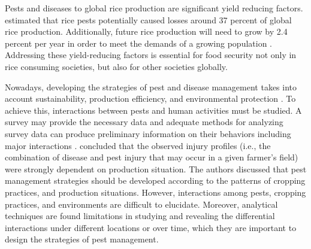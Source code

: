 ﻿%

Pests and diseases to global rice production are significant yield reducing factors.  estimated that rice pests potentially caused losses around 37 percent of global rice production. Additionally, future rice production will need to grow by 2.4 percent per year in order to meet the demands of a growing population . Addressing these yield-reducing factors is essential for food security not only in rice consuming societies, but also for other societies globally.

%
% 
%

Nowadays, developing the strategies of pest and disease management takes into account sustainability, production efficiency, and environmental protection . To achieve this, interactions between pests and human activities must be studied. A survey may provide the necessary data and adequate methods for analyzing survey data can produce preliminary information on their behaviors including major interactions .  concluded that the observed injury profiles (i.e., the combination of disease and pest injury that may occur in a given farmer’s field) were strongly dependent on production situation.  The authors discussed that pest management strategies should be developed according to the patterns of cropping practices, and production situations. However, interactions among pests, cropping practices, and environments are difficult to elucidate. Moreover,  analytical techniques are found limitations in studying and revealing  the differential interactions under different locations or over time, which they are important to design the strategies of pest management. 

